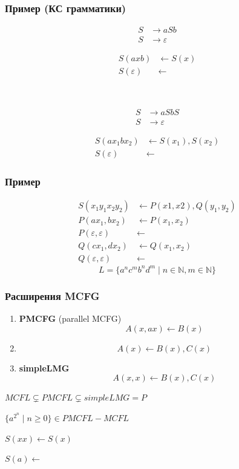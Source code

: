 \documentclass{beamer}
\begin{document}
\begin{frame}[fragile]
  \frametitle{Пример (КС грамматики)}
\begin{minipage}[t]{0.48\textwidth}
\begin{align*}
S &\to a S b \\
S &\to \varepsilon
\end{align*}

\begin{align*}
S(axb) & \leftarrow S(x) \\
S(\varepsilon) & \leftarrow
\end{align*}
\end{minipage}
~\pause
\begin{minipage}[t]{0.48\textwidth}
\begin{align*}
S &\to a S b S\\
S &\to \varepsilon
\end{align*}

\begin{align*}
S(ax_1bx_2) & \leftarrow S(x_1), S(x_2) \\
S(\varepsilon) & \leftarrow
\end{align*}
\end{minipage}

\end{frame}


\begin{frame}[fragile]

  \frametitle{Пример}

\begin{align*}
S(x_1 y_1 x_2 y_2) & \leftarrow P(x1,x2),Q(y_1,y_2) \\
P(ax_1, bx_2) & \leftarrow P(x_1,x_2) \\
P(\varepsilon,\varepsilon) &\leftarrow  \\
Q(cx_1, dx_2) & \leftarrow Q(x_1,x_2) \\
Q(\varepsilon,\varepsilon) &\leftarrow
\end{align*}
\pause
$$
L = \{a^nc^mb^nd^m \mid n \in \mathbb{N}, m \in \mathbb{N} \}
$$
\end{frame}

\begin{frame}[fragile]

  \frametitle{Расширения MCFG}
  \begin{enumerate}
    \item \textbf{PMCFG} (parallel MCFG)
    $$
    A(x, ax) \leftarrow B(x)
    $$

    \item
    $$
    A(x) \leftarrow B(x),C(x)
    $$
    \item \textbf{simpleLMG}
    $$
    A(x, x) \leftarrow B(x),C(x)
    $$
  \end{enumerate}
  \pause
  $MCFL \varsubsetneq PMCFL \varsubsetneq simpleLMG = P$

  $\{a^{2^n} \mid n\geq 0\} \in PMCFL - MCFL $

  $S(xx) \leftarrow S(x)$

  $S(a) \leftarrow $
\end{frame}
\end{document}
